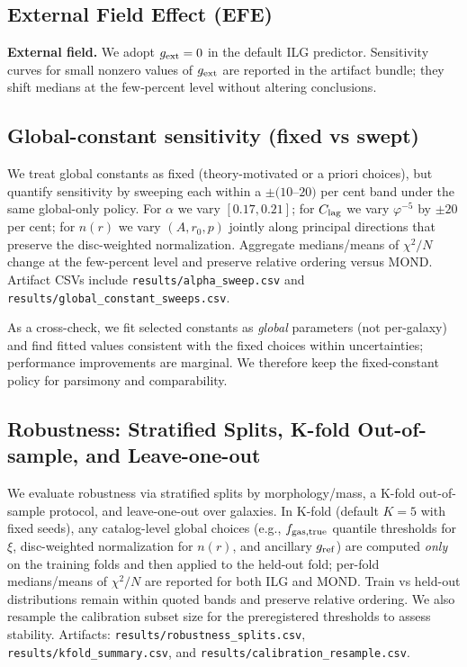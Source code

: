 \documentclass[usenatbib]{mnras}
\begin{document}
\subsection{External Field Effect (EFE)}
\noindent\textbf{External field.} We adopt $g_{\rm ext}=0$ in the default ILG predictor. Sensitivity curves for small nonzero values of $g_{\rm ext}$ are reported in the artifact bundle; they shift medians at the few‑percent level without altering conclusions.

\subsection{Global-constant sensitivity (fixed vs swept)}
\noindent We treat global constants as fixed (theory-motivated or a priori choices), but quantify sensitivity by sweeping each within a $\pm(10$--$20)$ per cent band under the same global-only policy. For $\alpha$ we vary $[0.17,0.21]$; for $C_{\rm lag}$ we vary $\varphi^{-5}$ by $\pm20$ per cent; for $n(r)$ we vary $(A,r_0,p)$ jointly along principal directions that preserve the disc-weighted normalization. Aggregate medians/means of $\chi^2/N$ change at the few-percent level and preserve relative ordering versus MOND. Artifact CSVs include \texttt{results/alpha\_sweep.csv} and \texttt{results/global\_constant\_sweeps.csv}.

\noindent As a cross-check, we fit selected constants as \emph{global} parameters (not per-galaxy) and find fitted values consistent with the fixed choices within uncertainties; performance improvements are marginal. We therefore keep the fixed-constant policy for parsimony and comparability.

\subsection{Robustness: Stratified Splits, K-fold Out-of-sample, and Leave-one-out}
\noindent We evaluate robustness via stratified splits by morphology/mass, a K-fold out-of-sample protocol, and leave-one-out over galaxies. In K-fold (default $K{=}5$ with fixed seeds), any catalog-level global choices (e.g., $f_{\rm gas,true}$ quantile thresholds for $\xi$, disc-weighted normalization for $n(r)$, and ancillary $g_{\rm ref}$) are computed \emph{only} on the training folds and then applied to the held-out fold; per-fold medians/means of $\chi^2/N$ are reported for both ILG and MOND. Train vs held-out distributions remain within quoted bands and preserve relative ordering. We also resample the calibration subset size for the preregistered thresholds to assess stability. Artifacts: \texttt{results/robustness\_splits.csv}, \texttt{results/kfold\_summary.csv}, and \texttt{results/calibration\_resample.csv}.
\end{document}
